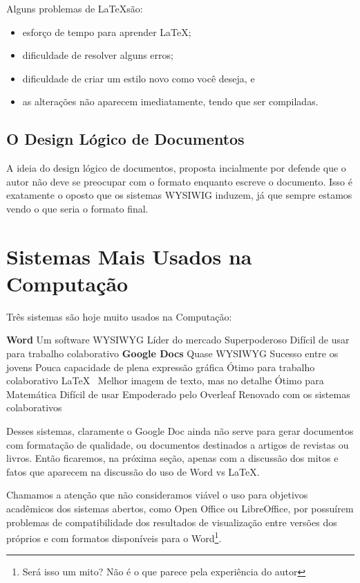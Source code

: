 Alguns problemas de \LaTeX são:
\begin{itemize}
    \item esforço de tempo para aprender \LaTeX;
    \item dificuldade de resolver alguns erros;
    \item dificuldade de criar um estilo novo como você deseja, e
    \item as alterações não aparecem imediatamente, tendo que ser compiladas.
\end{itemize}


\subsection{O Design Lógico de Documentos}

A ideia do design lógico de documentos, proposta incialmente por \textcite{Reid:1980} defende que o autor não deve se preocupar
com o formato enquanto escreve o documento. Isso é exatamente o 
oposto que os sistemas WYSIWIG induzem, já que sempre estamos
vendo o que seria o formato final. 

\section{Sistemas Mais Usados na Computação}

Três sistemas são hoje muito usados na Computação:
    \begin{outline}
    \1 \textbf{Word}
    \2 Um software WYSIWYG
    \2 Líder do mercado
    \2 Superpoderoso
    \2 Difícil de usar para trabalho colaborativo
    \1 \textbf{Google Docs}
    \2 Quase WYSIWYG
    \2 Sucesso entre os  jovens
    \2 Pouca capacidade de plena expressão gráfica
    \2 Ótimo para trabalho colaborativo
    \1 \LaTeX\
    \2 Melhor imagem de texto, mas no detalhe
    \2 Ótimo para Matemática
    \2 Difícil de usar
    \2 Empoderado pelo Overleaf
    \2 Renovado com os sistemas colaborativos
\end{outline}

Desses sistemas, claramente o Google Doc ainda não serve para gerar documentos com formatação de qualidade, ou documentos destinados a artigos de revistas ou livros. Então ficaremos, na próxima seção, apenas com a discussão dos mitos e fatos que aparecem na discussão do uso de Word vs \LaTeX.

Chamamos a atenção que não consideramos viável o uso para objetivos acadêmicos dos sistemas abertos, como Open Office ou LibreOffice, por possuírem problemas de compatibilidade dos resultados de visualização entre versões dos próprios e com formatos disponíveis para o Word\footnote{Será isso um mito? Não é o que parece pela experiência do autor}.

